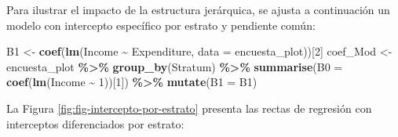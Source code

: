 \documentclass[
  spanish,
  12pt,
]{book}
\newenvironment{Shaded}{\begin{snugshade}}{\end{snugshade}}
\newcommand{\AttributeTok}[1]{\textcolor[rgb]{0.13,0.29,0.53}{#1}}
\newcommand{\DecValTok}[1]{\textcolor[rgb]{0.00,0.00,0.81}{#1}}
\newcommand{\FloatTok}[1]{\textcolor[rgb]{0.00,0.00,0.81}{#1}}
\newcommand{\FunctionTok}[1]{\textcolor[rgb]{0.13,0.29,0.53}{\textbf{#1}}}
\newcommand{\NormalTok}[1]{#1}
\newcommand{\OtherTok}[1]{\textcolor[rgb]{0.56,0.35,0.01}{#1}}
\newcommand{\SpecialCharTok}[1]{\textcolor[rgb]{0.81,0.36,0.00}{\textbf{#1}}}
\newcommand{\StringTok}[1]{\textcolor[rgb]{0.31,0.60,0.02}{#1}}
\newcounter{none} %
\begin{document}
Para ilustrar el impacto de la estructura jerárquica, se ajusta a continuación un modelo con intercepto específico por estrato y pendiente común:

\begin{Shaded}
\begin{Highlighting}[]
\NormalTok{B1 }\OtherTok{\textless{}{-}} \FunctionTok{coef}\NormalTok{(}\FunctionTok{lm}\NormalTok{(Income }\SpecialCharTok{\textasciitilde{}}\NormalTok{ Expenditure, }\AttributeTok{data =}\NormalTok{ encuesta\_plot))[}\DecValTok{2}\NormalTok{]}
\NormalTok{coef\_Mod }\OtherTok{\textless{}{-}}\NormalTok{ encuesta\_plot }\SpecialCharTok{\%\textgreater{}\%}
  \FunctionTok{group\_by}\NormalTok{(Stratum) }\SpecialCharTok{\%\textgreater{}\%}
  \FunctionTok{summarise}\NormalTok{(}\AttributeTok{B0 =} \FunctionTok{coef}\NormalTok{(}\FunctionTok{lm}\NormalTok{(Income }\SpecialCharTok{\textasciitilde{}} \DecValTok{1}\NormalTok{))[}\DecValTok{1}\NormalTok{]) }\SpecialCharTok{\%\textgreater{}\%}
  \FunctionTok{mutate}\NormalTok{(}\AttributeTok{B1 =}\NormalTok{ B1)}
\end{Highlighting}
\end{Shaded}

La Figura \ref{fig:fig-intercepto-por-estrato} presenta las rectas de regresión con interceptos diferenciados por estrato:

\begin{Shaded}
\end{Shaded}
\end{document}
